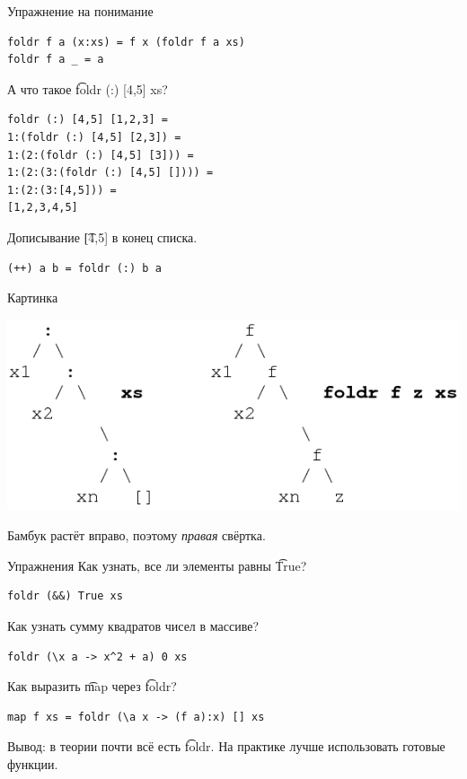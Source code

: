 \begin{frame}[fragile]{Упражнение на понимание}
\begin{verbatim}
foldr f a (x:xs) = f x (foldr f a xs)
foldr f a _ = a
\end{verbatim}

	А что такое \t{foldr (:) [4,5] xs}?
	\pause
\begin{verbatim}
foldr (:) [4,5] [1,2,3] =
1:(foldr (:) [4,5] [2,3]) =
1:(2:(foldr (:) [4,5] [3])) =
1:(2:(3:(foldr (:) [4,5] []))) =
1:(2:(3:[4,5])) =
[1,2,3,4,5]
\end{verbatim}
	Дописывание \t{[4,5]} в конец списка.

\begin{verbatim}
(++) a b = foldr (:) b a
\end{verbatim}
\end{frame}

\begin{frame}{Картинка}
	\begin{center}
		\includegraphics[scale=0.5]{foldr.png}
	\end{center}
	Бамбук растёт вправо, поэтому \textit{правая} свёртка.
\end{frame}

\begin{frame}[fragile]{Упражнения}
	Как узнать, все ли элементы равны \t{True}? \pause
\begin{verbatim}
foldr (&&) True xs
\end{verbatim}

	Как узнать сумму квадратов чисел в массиве? \pause
\begin{verbatim}
foldr (\x a -> x^2 + a) 0 xs
\end{verbatim}

	Как выразить \t{map} через \t{foldr}? \pause
\begin{verbatim}
map f xs = foldr (\a x -> (f a):x) [] xs
\end{verbatim}
	Вывод: в теории почти всё есть \t{foldr}.
	На практике лучше использовать готовые функции.
\end{frame}
